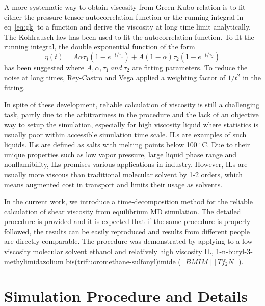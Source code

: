 \documentclass[12pt]{article}
\begin{document}
A more systematic way to obtain viscosity from Green-Kubo relation
is to fit either the pressure tensor autocorrelation function 
or the running integral in eq~\ref{eq:gk} to a function
and derive the viscosity at long time limit analytically.
The Kohlrausch law has been used to fit the autocorrelation function.
\cite{Zhang.MP.100.2617.2002,
Meyer.PRE.90.043101.2014}
To fit the running integral,
the double exponential function of the form 
\begin{equation}
{\eta(t) = A\alpha\tau_1(1-e^{-t/{\tau_1}}) + A(1-\alpha)\tau_2(1-e^{-t/{\tau_2}}) }
\label{eq:visc_fit}
\end{equation}
has been suggested 
where $A, \alpha, \tau_1 \ and \ \tau_2$ are fitting parameters.
\cite{Hess.JCP.116.209.2002,
Rey-Castro.JPC.B.110.14426.2006}
To reduce the noise at long times,
Rey-Castro and Vega applied a weighting factor of $1/t^2$ in the fitting.
\cite{Rey-Castro.JPC.B.110.14426.2006}


In spite of these development,
reliable calculation of viscosity is still a challenging task,
partly due to the arbitrariness in the procedure and the lack of an objective way to setup the simulation,
especially for high viscosity liquid where statistics is usually poor within accessible simulation time scale.
ILs are examples of such liquids.
ILs are defined as salts with melting points below 100 $^\circ$C.
Due to their unique properties such as low vapor pressure, large liquid phase range and nonflamibility,
ILs promises various applications in industry.
However, ILs are usually more viscous than traditional molecular solvent by 1-2 orders,
which means augmented cost in transport and limits their usage as solvents.

In the current work, we introduce a time-decomposition method for the reliable calculation of shear viscosity 
from equilibrium MD simulation.
The detailed procedure is provided and
it is expected that if the same procedure is properly followed,
the results can be easily reproduced and results from different people are directly comparable.
The procedure was demonstrated by applying to a low viscosity molecular solvent ethanol and relatively high viscosity IL, 
1-n-butyl-3-methylimidazolium bis(trifluoromethane-sulfonyl)imide ($[BMIM][Tf_2N]$).



\section{Simulation Procedure and Details}
\end{document}
